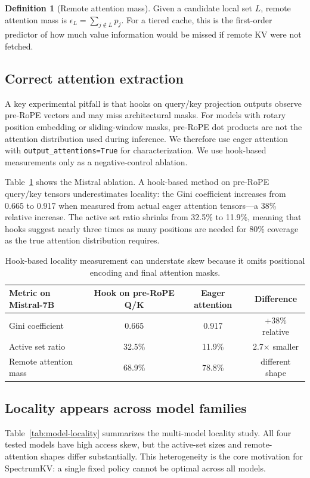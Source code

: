 \documentclass[11pt]{article}
\newcommand{\method}{SpectrumKV}
\newcommand{\pct}{\%}
\theoremstyle{definition}
\newtheorem{definition}{Definition}
\theoremstyle{plain}
\begin{document}
\begin{definition}[Remote attention mass]
Given a candidate local set $L$, remote attention mass is $\epsilon_L=\sum_{j\notin L}p_j$.  For a tiered cache, this is the first-order predictor of how much value information would be missed if remote KV were not fetched.
\end{definition}

\subsection{Correct attention extraction}
A key experimental pitfall is that hooks on query/key projection outputs observe pre-RoPE vectors and may miss architectural masks.  For models with rotary position embedding or sliding-window masks, pre-RoPE dot products are not the attention distribution used during inference.  We therefore use eager attention with \texttt{output\_attentions=True} for characterization.  We use hook-based measurements only as a negative-control ablation.

Table~\ref{tab:hook-eager} shows the Mistral ablation.  A hook-based method on pre-RoPE query/key tensors underestimates locality: the Gini coefficient increases from 0.665 to 0.917 when measured from actual eager attention tensors---a 38\pct{} relative increase.  The active set ratio shrinks from 32.5\pct{} to 11.9\pct{}, meaning that hooks suggest nearly three times as many positions are needed for 80\pct{} coverage as the true attention distribution requires.

\begin{table}[t]
\centering
\caption{Hook-based locality measurement can understate skew because it omits positional encoding and final attention masks.}
\label{tab:hook-eager}
\small
\begin{tabular}{lccc}
\toprule
Metric on Mistral-7B & Hook on pre-RoPE Q/K & Eager attention & Difference \\
\midrule
Gini coefficient & 0.665 & 0.917 & +38\pct{} relative \\
Active set ratio & 32.5\pct{} & 11.9\pct{} & 2.7$\times$ smaller \\
Remote attention mass & 68.9\pct{} & 78.8\pct{} & different shape \\
\bottomrule
\end{tabular}
\end{table}

\subsection{Locality appears across model families}
Table~\ref{tab:model-locality} summarizes the multi-model locality study.  All four tested models have high access skew, but the active-set sizes and remote-attention shapes differ substantially.  This heterogeneity is the core motivation for \method{}: a single fixed policy cannot be optimal across all models.
\end{document}
